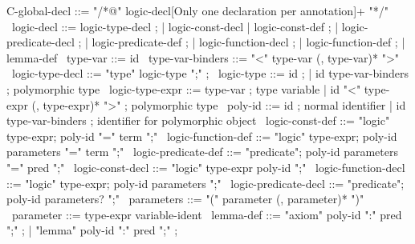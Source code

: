 \begin{syntax}
  C-global-decl ::= "/*@" logic-decl{[Only one declaration per annotation]+} "*/"
  \
  logic-decl ::= logic-type-decl ;
          | logic-const-decl | logic-const-def ;
          | logic-predicate-decl ;
          | logic-predicate-def ;
          | logic-function-decl ;
          | logic-function-def ;
          | lemma-def
  \
  type-var ::= id
  \
  type-var-binders ::= "<" type-var (, type-var)* ">"
  \
  logic-type-decl ::= "type" logic-type ";" ;
  \
  logic-type ::= id ;
  | id type-var-binders ; polymorphic type
  \
  logic-type-expr ::= type-var ; type variable
  | id "<" type-expr (, type-expr)* ">" ; polymorphic type
  \
  poly-id ::= id ; normal identifier
  | id type-var-binders ; identifier for polymorphic object
  \
  logic-const-def ::= {"logic" type-expr;
    poly-id "=" term ";"}
  \
  logic-function-def ::= "logic" type-expr;
  poly-id parameters "=" term ";"
  \
  logic-predicate-def ::=
  "predicate";
  poly-id parameters "=" pred ";"
  \
  logic-const-decl ::= { "logic" type-expr poly-id ";"}
  \
  logic-function-decl ::=
  "logic" type-expr;
  poly-id parameters ";"
  \
  logic-predicate-decl ::=
  "predicate";
  poly-id parameters? ";"
  \
  parameters ::= "(" parameter (, parameter)* ")"
  \
  parameter ::= type-expr variable-ident
  \
  lemma-def ::= "axiom" poly-id ":" pred ";" ;
  | "lemma" poly-id ":" pred ";" ;
\end{syntax}